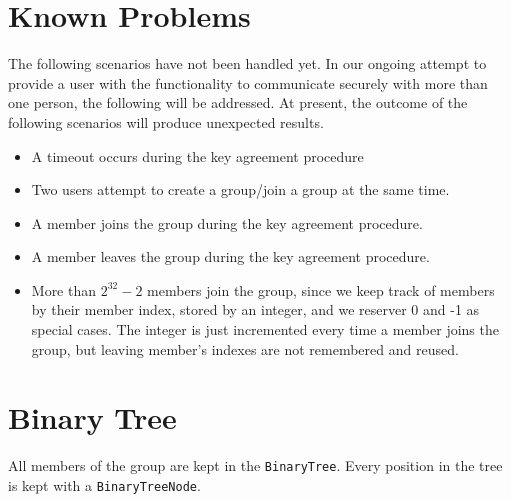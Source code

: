 \documentclass[12pt]{article}
\newcommand{\code}[1]{\texttt{#1}}
\begin{document}
    \section{Known Problems}
    \label{xfer:known_problems}
     The following scenarios have not been handled yet.  In our ongoing attempt
     to provide a user with the functionality to communicate securely with more
     than one person, the following will be addressed.  At present, the outcome
     of the following scenarios will produce unexpected results.
     \begin{itemize}
	\item	A timeout occurs during the key agreement procedure
	\item	Two users attempt to create a group/join a group at the same 
		time.
	\item	A member joins the group during the key agreement procedure.
	\item	A member leaves the group during the key agreement procedure.
	\item   More than \begin{math} 2^{32} - 2 \end{math} members join the 
		group, since we keep track of members by their member index, 
		stored by an integer, and we reserver 0 and -1 as special cases.
		The integer is just incremented every time a member joins the 
		group, but leaving member's indexes are not remembered and 
		reused.
     \end{itemize}

    \section{Binary Tree}
    \label{xref:binary_tree}
     All members of the group are kept in the \code{BinaryTree}.  Every position
     in the tree is kept with a \code{BinaryTreeNode}.  
\end{document}
